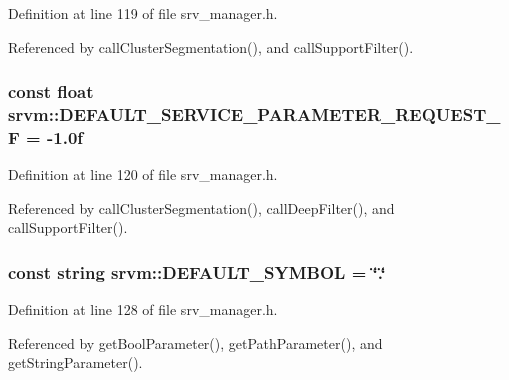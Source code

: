 Definition at line 119 of file srv\-\_\-manager.\-h.



Referenced by call\-Cluster\-Segmentation(), and call\-Support\-Filter().

\hypertarget{namespacesrvm_a5a9ae08c1a139bbf76b39c5d34f90e2a}{
\subsubsection[{D\-E\-F\-A\-U\-L\-T\-\_\-\-S\-E\-R\-V\-I\-C\-E\-\_\-\-P\-A\-R\-A\-M\-E\-T\-E\-R\-\_\-\-R\-E\-Q\-U\-E\-S\-T\-\_\-\-F}]{\setlength{\rightskip}{0pt plus 5cm}const float srvm\-::\-D\-E\-F\-A\-U\-L\-T\-\_\-\-S\-E\-R\-V\-I\-C\-E\-\_\-\-P\-A\-R\-A\-M\-E\-T\-E\-R\-\_\-\-R\-E\-Q\-U\-E\-S\-T\-\_\-\-F = -\/1.\-0f}}\label{namespacesrvm_a5a9ae08c1a139bbf76b39c5d34f90e2a}


Definition at line 120 of file srv\-\_\-manager.\-h.



Referenced by call\-Cluster\-Segmentation(), call\-Deep\-Filter(), and call\-Support\-Filter().

\hypertarget{namespacesrvm_a01e5397d10883ed88b8d0abf1cfdd2ff}{
\subsubsection[{D\-E\-F\-A\-U\-L\-T\-\_\-\-S\-Y\-M\-B\-O\-L}]{\setlength{\rightskip}{0pt plus 5cm}const string srvm\-::\-D\-E\-F\-A\-U\-L\-T\-\_\-\-S\-Y\-M\-B\-O\-L = \char`\"{}.\char`\"{}}}\label{namespacesrvm_a01e5397d10883ed88b8d0abf1cfdd2ff}


Definition at line 128 of file srv\-\_\-manager.\-h.



Referenced by get\-Bool\-Parameter(), get\-Path\-Parameter(), and get\-String\-Parameter().

